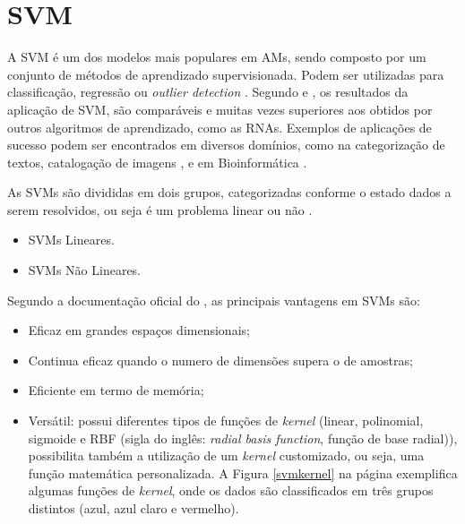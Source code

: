 \section{SVM}

A SVM é um dos modelos mais populares em AMs, sendo composto por um conjunto de métodos de aprendizado supervisionada. Podem ser utilizadas para classificação, regressão ou \textit{outlier detection} \cite{scikitlearn}. Segundo  e , os resultados da aplicação de SVM, são comparáveis e muitas vezes superiores aos obtidos por outros algoritmos de aprendizado, como as RNAs. Exemplos de aplicações de sucesso podem ser encontrados em diversos domínios, como na categorização de textos,  catalogação de imagens \cite{pontil1998support}, e em Bioinformática \cite{noble2004support}.

As SVMs são divididas em dois grupos, categorizadas conforme o estado dados a serem resolvidos, ou seja é um problema linear ou não \cite{lorena2007introduccao}.
\begin{itemize}
    \item SVMs Lineares.
    \item SVMs Não Lineares.
\end{itemize}

Segundo a documentação oficial do , as principais vantagens em SVMs são:

\begin{itemize}
    \item Eficaz em grandes espaços dimensionais;
    \item Continua eficaz quando o numero de dimensões supera o de amostras;
    \item Eficiente em termo de memória;
    \item Versátil: possui diferentes tipos de funções de \textit{kernel} (linear, polinomial, sigmoide e RBF (sigla do inglês: \textit{radial basis function}, função de base radial)), possibilita também a utilização de um \textit{kernel} customizado, ou seja, uma função matemática personalizada. A Figura \ref{svmkernel} na página \pageref{svmkernel} exemplifica algumas funções de \textit{kernel}, onde os dados são classificados em três grupos distintos (azul, azul claro e vermelho).
\end{itemize}

